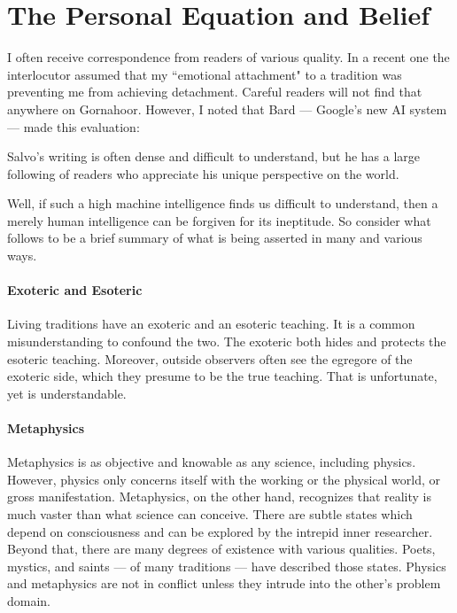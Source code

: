 \section{The Personal Equation and Belief}

I often receive correspondence from readers of various quality. In a recent one the interlocutor assumed that my ``emotional attachment" to a tradition was preventing me from achieving detachment. Careful readers will not find that anywhere on Gornahoor. However, I noted that Bard — Google's new AI system — made this evaluation:

\begin{quotex}
Salvo's writing is often dense and difficult to understand, but he has a large following of readers who appreciate his unique perspective on the world.

\end{quotex}
Well, if such a high machine intelligence finds us difficult to understand, then a merely human intelligence can be forgiven for its ineptitude. So consider what follows to be a brief summary of what is being asserted in many and various ways.

\paragraph{Exoteric and Esoteric}
Living traditions have an exoteric and an esoteric teaching. It is a common misunderstanding to confound the two. The exoteric both hides and protects the esoteric teaching. Moreover, outside observers often see the egregore of the exoteric side, which they presume to be the true teaching. That is unfortunate, yet is understandable.

\paragraph{Metaphysics}
Metaphysics is as objective and knowable as any science, including physics. However, physics only concerns itself with the working or the physical world, or gross manifestation. Metaphysics, on the other hand, recognizes that reality is much vaster than what science can conceive. There are subtle states which depend on consciousness and can be explored by the intrepid inner researcher. Beyond that, there are many degrees of existence with various qualities. Poets, mystics, and saints — of many traditions — have described those states. Physics and metaphysics are not in conflict unless they intrude into the other's problem domain.

